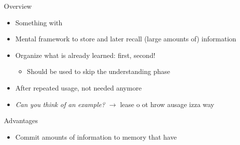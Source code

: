 \documentclass{ercisbeamer}
\begin{document}
\begin{frame}{Overview}
    \begin{tbox}
        \begin{itemize}
            \item Something with 
            \item Mental framework to store and later recall (large amounts of) information
            \item Organize what is already learned:  first,  second!
            \begin{itemize}
                \item Should  be used to skip the understanding phase
            \end{itemize} 
            \item After repeated usage, not needed anymore
            \item \emph{Can you think of an example?} \pause
            $\rightarrow$ lease o ot hrow ausage izza way 
        \end{itemize}
    \end{tbox}
\end{frame}
\setbgimage{}

\begin{frame}{Advantages}
    \begin{itemize}
        \item Commit  amounts of information to memory that have 
    \end{itemize}
\end{frame}
\end{document}
